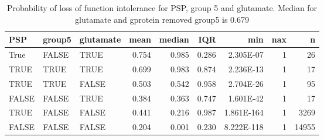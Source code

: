 \begin{table}[ht]
\centering
\begin{tabular}{lllrrrrrr}
  \toprule
PSP & group5 & glutamate & mean & median & IQR & min & nax & n \\ 
  \midrule
True   & FALSE & TRUE & 0.754 & 0.985 & 0.286 & 2.305E-07 & 1 & 26 \\ 
  TRUE & TRUE & TRUE & 0.699 & 0.983 & 0.874 & 2.236E-13 & 1 & 17 \\ 
  TRUE & TRUE & FALSE & 0.503 & 0.542 & 0.958 & 2.704E-26 & 1 & 95 \\ 
  FALSE & FALSE & TRUE & 0.384 & 0.363 & 0.747 & 1.601E-42 & 1 & 17 \\ 
  TRUE & FALSE & FALSE & 0.441 & 0.216 & 0.987 & 1.861E-164 & 1 & 3269 \\ 
  FALSE & FALSE & FALSE & 0.204 & 0.001 & 0.230 & 8.222E-118 & 1 & 14955 \\ 
   \bottomrule
\end{tabular}
\caption{Probability of loss of function intolerance for PSP, group 5 and glutamate. Median for glutamate and gprotein removed group5 is 0.679} 
\label{tab:Probability of loss of function intolerance for PSP, group 5 and glutamate}
\end{table}





